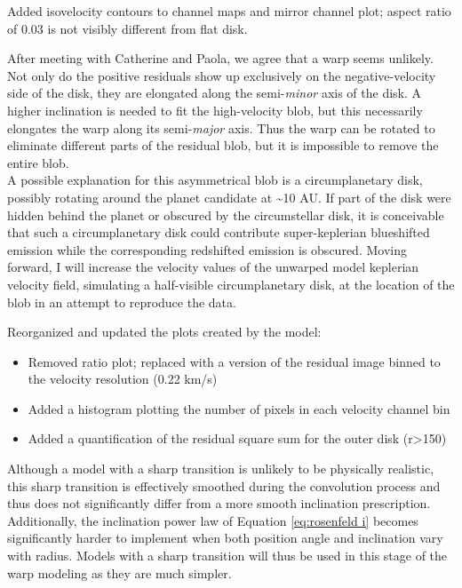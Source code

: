 \documentclass[a4paper]{tufte-handout}
\begin{document}
\noindent Added isovelocity contours to channel maps and mirror channel plot; aspect ratio of 0.03 is not visibly different from flat disk.

After meeting with Catherine and Paola, we agree that a warp seems unlikely. Not only do the positive residuals show up exclusively on the negative-velocity side of the disk, they are elongated along the semi-\textit{minor} axis of the disk. A higher inclination is needed to fit the high-velocity blob, but this necessarily  elongates the warp along its semi-\textit{major} axis. Thus the warp can be rotated to eliminate different parts of the residual blob, but it is impossible to remove the entire blob.\\
A possible explanation for this asymmetrical blob is a circumplanetary disk, possibly rotating around the planet candidate at \textasciitilde10 AU. \citep{Walsh14} If part of the disk were hidden behind the planet or obscured by the circumstellar disk, it is conceivable that such a circumplanetary disk could contribute super-keplerian blueshifted emission while the corresponding redshifted emission is obscured. Moving forward, I will increase the velocity values of the unwarped model keplerian velocity field, simulating a half-visible circumplanetary disk, at the location of the blob in an attempt to reproduce the data.



\hrulefill


Reorganized and updated the plots created by the model:
\begin{itemize}
  \item Removed ratio plot; replaced with a version of the residual image binned to the velocity resolution (0.22 km/s)
  \item Added a histogram plotting the number of pixels in each velocity channel bin
  \item Added a quantification of the residual square sum for the outer disk (r>150)

\end{itemize}

\hrulefill


Although a model with a sharp transition is unlikely to be physically realistic, this sharp transition is effectively smoothed during the convolution process and thus does not significantly differ from a more smooth inclination prescription. Additionally, the inclination power law of Equation \ref{eq:rosenfeld i} becomes significantly harder to implement when both position angle and inclination vary with radius.  Models with a sharp transition will thus be used in this stage of the warp modeling as they are much simpler.
\end{document}
